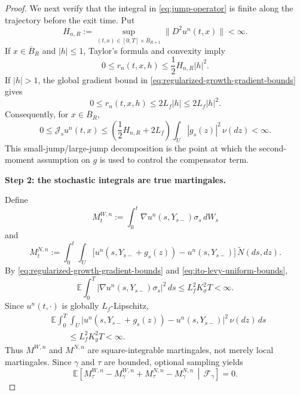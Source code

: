 \documentclass[12pt,oneside, reqno]{amsart}
\numberwithin{equation}{section}
\begin{document}
\begin{proof}
	We next verify that the integral in
	\eqref{eq:jump-operator} is finite along the trajectory before the
	exit time. Put
	\[
	H_{n,R}
	:=
	\sup_{(t,x)\in[0,T]\times\overline B_{R+1}}
	\|D^2u^n(t,x)\|
	<\infty.
	\]
	If \(x\in\overline B_R\) and \(|h|\leq1\), Taylor's formula and
	convexity imply
	\begin{equation}
		\label{eq:small-jump-remainder}
		0
		\leq
		r_n(t,x,h)
		\leq
		\frac12 H_{n,R}|h|^2.
	\end{equation}
	If \(|h|>1\), the global gradient bound in
	\eqref{eq:regularized-growth-gradient-bounds} gives
	\begin{equation}
		\label{eq:large-jump-remainder}
		0
		\leq
		r_n(t,x,h)
		\leq
		2L_f|h|
		\leq
		2L_f|h|^2.
	\end{equation}
	Consequently, for \(x\in\overline B_R\),
	\begin{equation}
		\label{eq:jump-operator-integrability}
		0
		\leq
		\mathcal J_su^n(t,x)
		\leq
		\left(
		\frac12 H_{n,R}+2L_f
		\right)
		\int_U|g_s(z)|^2\,\nu(dz)
		<\infty.
	\end{equation}
	This small-jump/large-jump decomposition is the point at which the
	second-moment assumption on \(g\) is used to control the compensator
	term.
	
	
	\textbf{Step 2: the stochastic integrals are true martingales.}
	
	Define
	\[
	M_t^{W,n}
	:=
	\int_0^t
	\nabla u^n(s,Y_{s-})\sigma_s\,dW_s
	\]
	and
	\[
	M_t^{N,n}
	:=
	\int_0^t\int_U
	\bigl[
	u^n(s,Y_{s-}+g_s(z))
	-u^n(s,Y_{s-})
	\bigr]
	\,\widetilde N(ds,dz).
	\]
	By \eqref{eq:regularized-growth-gradient-bounds} and
	\eqref{eq:ito-levy-uniform-bounds},
	\begin{equation}
		\label{eq:brownian-martingale-L2}
		\mathbb E\int_0^T
		|\nabla u^n(s,Y_{s-})\sigma_s|^2\,ds
		\leq
		L_f^2K_\sigma^2T
		<\infty.
	\end{equation}
	Since \(u^n(t,\cdot)\) is globally \(L_f\)-Lipschitz,
	\begin{equation}
		\label{eq:poisson-martingale-L2}
		\begin{aligned}
			&\mathbb E\int_0^T\int_U
			\bigl|
			u^n(s,Y_{s-}+g_s(z))
			-u^n(s,Y_{s-})
			\bigr|^2
			\,\nu(dz)\,ds
			\\
			&\qquad
			\leq
			L_f^2K_g^2T
			<\infty.
		\end{aligned}
	\end{equation}
	Thus \(M^{W,n}\) and \(M^{N,n}\) are square-integrable martingales,
	not merely local martingales. Since \(\gamma\) and \(\tau\) are
	bounded, optional sampling yields
	\begin{equation}
		\label{eq:conditional-martingale-increments-zero}
		\mathbb E\left[
		M_\tau^{W,n}-M_\gamma^{W,n}
		+
		M_\tau^{N,n}-M_\gamma^{N,n}
		\,\middle|\,
		\mathcal F_\gamma
		\right]
		=0.
	\end{equation}


\end{proof}
\end{document}
